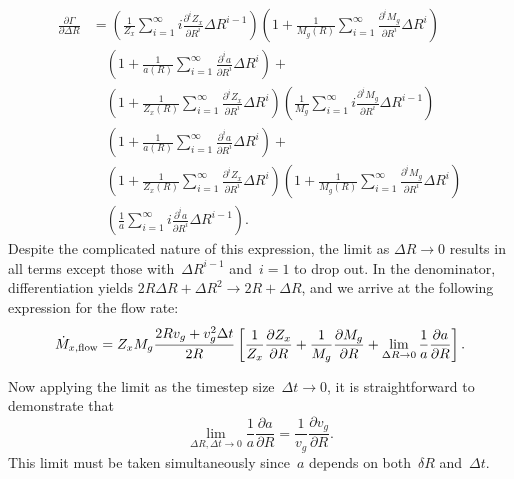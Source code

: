 \documentclass[main.tex]{subfiles}
\begin{document}
\begin{equation}\begin{split}
\frac{\partial \Gamma}{\partial \Delta R} &=
\left(\frac{1}{Z_x} \sum_{i = 1}^\infty i
\frac{\partial^i Z_x}{\partial R^i} \Delta R^{i - 1}\right)
\left(1 + \frac{1}{M_g(R)}
\sum_{i = 1}^\infty \frac{\partial^i M_g}{\partial R^i} \Delta R^i\right)
\\
&\quad
\left(1 + \frac{1}{a(R)}
\sum_{i = 1}^\infty \frac{\partial^i a}{\partial R^i} \Delta R^i\right) +
\\
&\quad
\left(1 + \frac{1}{Z_x(R)}
\sum_{i = 1}^\infty \frac{\partial^i Z_x}{\partial R^i} \Delta R^i\right)
\left(\frac{1}{M_g} \sum_{i = 1}^\infty i
\frac{\partial^i M_g}{\partial R^i} \Delta R^{i - 1}\right)
\\
&\quad
\left(1 + \frac{1}{a(R)}
\sum_{i = 1}^\infty \frac{\partial^i a}{\partial R^i} \Delta R^i\right) +
\\
&\quad
\left(1 + \frac{1}{Z_x(R)}
\sum_{i = 1}^\infty \frac{\partial^i Z_x}{\partial R^i} \Delta R^i\right)
\left(1 + \frac{1}{M_g(R)}
\sum_{i = 1}^\infty \frac{\partial^i M_g}{\partial R^i} \Delta R^i\right)
\\
&\quad
\left(\frac{1}{a} \sum_{i = 1}^\infty i \frac{\partial^i a}{\partial R^i}
\Delta R^{i - 1}\right).
\end{split}\end{equation}
Despite the complicated nature of this expression, the limit as
$\Delta R \rightarrow 0$ results in all terms except those
with~$\Delta R^{i - 1}$ and~$i = 1$ to drop out.
In the denominator, differentiation yields
$2 R \Delta R + \Delta R^2 \rightarrow 2R + \Delta R$, and we arrive at the
following expression for the flow rate:
\begin{equation}
\dot{M}_{x,\text{flow}} = Z_x M_g \frac{2 R v_g + v_g^2 \Delta t}{2R} \left[
\frac{1}{Z_x} \frac{\partial Z_x}{\partial R} +
\frac{1}{M_g} \frac{\partial M_g}{\partial R} +
\lim_{\Delta R \rightarrow 0} \frac{1}{a} \frac{\partial a}{\partial R}
\right].
\end{equation}
\par
Now applying the limit as the timestep size~$\Delta t \rightarrow 0$, it is
straightforward to demonstrate that
\begin{equation}
\lim_{\Delta R, \Delta t \rightarrow 0} \frac{1}{a}
\frac{\partial a}{\partial R} = \frac{1}{v_g} \frac{\partial v_g}{\partial R}.
\end{equation}
This limit must be taken simultaneously since~$a$ depends on both~$\delta R$
and~$\Delta t$.
\end{document}

